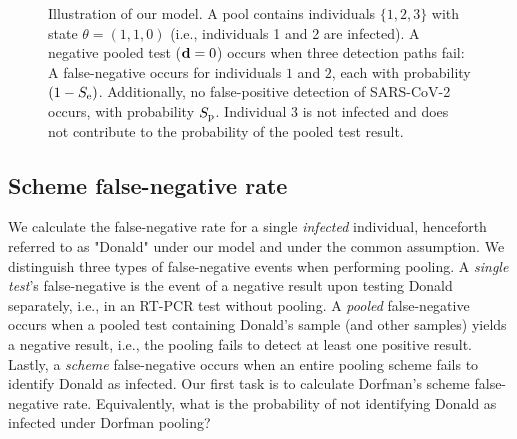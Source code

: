 \documentclass{article}
\begin{document}
\begin{figure}[H]
  \centering
  \caption{Illustration of our model. A pool contains individuals
    $\{1,2,3\}$ with state $\theta=(1,1,0)$ (i.e., individuals 1 and 2
    are infected). A negative pooled test ($\mathbf{d}=0$) occurs when
    three detection paths fail: A false-negative occurs for
    individuals $1$ and $2$, each with probability $(1-S_{\text{e}})$.
    Additionally, no false-positive detection of SARS-CoV-2 occurs,
    with probability $S_{\text{p}}$. Individual $3$ is not infected and does
    not contribute to the probability of the pooled test result.}\label{fig:likelihood}
\end{figure}


\subsection*{Scheme false-negative rate}
We calculate the false-negative rate for a single \emph{infected}
individual, henceforth referred to as "Donald" under our model and
under the common assumption. We distinguish three types of
false-negative events when performing pooling. A \emph{single test}'s
false-negative is the event of a negative result upon testing Donald
separately, i.e., in an RT-PCR test without pooling. A \emph{pooled}
false-negative occurs when a pooled test containing Donald's sample
(and other samples) yields a negative result, i.e., the pooling fails
to detect at least one positive result. Lastly, a \emph{scheme}
false-negative occurs when an entire pooling scheme fails to
identify Donald as infected. Our first task is to calculate Dorfman's
scheme false-negative rate. Equivalently, what is the probability of
not identifying Donald as infected under Dorfman pooling?
\end{document}
